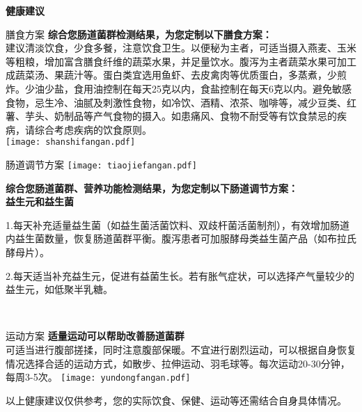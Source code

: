 

\usepackage{graphicx}
\graphicspath{{cores/}}



\vspace*{6mm}
\setlength{\arrayrulewidth}{1pt}
\fontsize{9.3pt}{11pt}\selectfont
\color{gray2}

\centerline{\bf\sanhao 健康建议}

\vspace*{2mm}

\begin{LRaside}[.20]{膳食方案}
{\bf *综合您肠道菌群检测结果，为您定制以下膳食方案：}\\
{\indent 建议清淡饮食，少食多餐，注意饮食卫生。以便秘为主者，可适当摄入燕麦、玉米等粗粮，增加富含膳食纤维的蔬菜水果，并足量饮水。腹泻为主者蔬菜水果可加工成蔬菜汤、果蔬汁等。蛋白类宜选用鱼虾、去皮禽肉等优质蛋白，多蒸煮，少煎炸。少油少盐，食用油控制在每天25克以内，食盐控制在每天6克以内。避免敏感食物，忌生冷、油腻及刺激性食物，如冷饮、酒精、浓茶、咖啡等，减少豆类、红薯、芋头、奶制品等产气食物的摄入。如患痛风、食物不耐受等有饮食禁忌的疾病，请综合考虑疾病的饮食原则。}\\
\asidebreak %
\noindent
\texttt{[image: shanshifangan.pdf]}

\end{LRaside}


\begin{LRaside}[.70]{肠道调节方案}
\noindent
\texttt{[image: tiaojiefangan.pdf]}

\asidebreak %
{\bf *综合您肠道菌群、营养功能检测结果，为您定制以下肠道调节方案：}\\
{\bf 益生元和益生菌}\\{\indent 1.每天补充适量益生菌（如益生菌活菌饮料、双歧杆菌活菌制剂），有效增加肠道内益生菌数量，恢复肠道菌群平衡。腹泻患者可加服酵母类益生菌产品（如布拉氏酵母片）。

2.每天适当补充益生元，促进有益菌生长。若有胀气症状，可以选择产气量较少的益生元，如低聚半乳糖。}\\
\end{LRaside}

\begin{LRaside}[.20]{运动方案}
{\bf *适量运动可以帮助改善肠道菌群}\\
{\indent 可适当进行腹部搓揉，同时注意腹部保暖。不宜进行剧烈运动，可以根据自身恢复情况选择合适的运动方式，如散步、拉伸运动、羽毛球等。每次运动20-30分钟，每周3-5次。}
\asidebreak %
\noindent
\texttt{[image: yundongfangan.pdf]}

\end{LRaside}

{\noindent\qihao *以上健康建议仅供参考，您的实际饮食、保健、运动等还需结合自身具体情况。}


